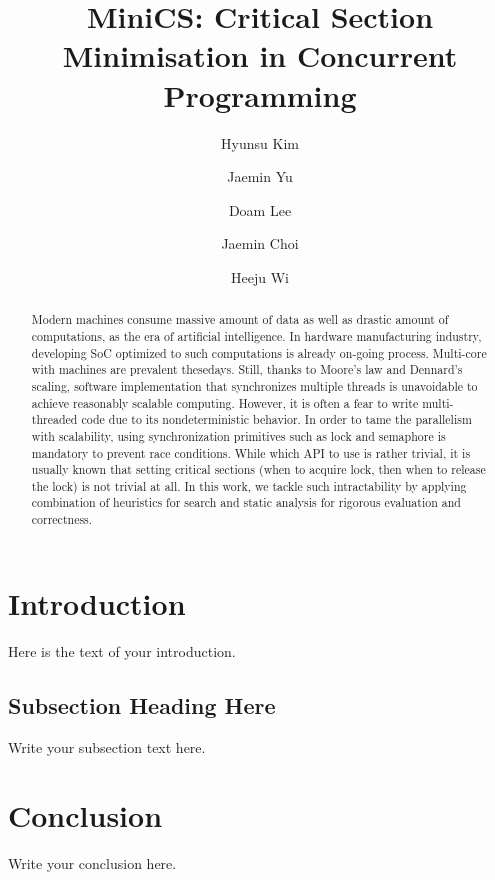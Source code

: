 \documentclass[sigchi]{acmart}
\begin{document}
\title{MiniCS: Critical Section Minimisation in Concurrent Programming}
\author{Hyunsu Kim}

\author{Jaemin Yu}

\author{Doam Lee}

\author{Jaemin Choi}

\author{Heeju Wi}

\begin{abstract}
Modern machines consume massive amount of data as well as drastic amount of computations, as the era of artificial intelligence. In hardware manufacturing industry, developing SoC optimized to such computations is already on-going process. Multi-core with machines are prevalent thesedays. Still, thanks to Moore's law and Dennard's scaling, software implementation that synchronizes multiple threads is unavoidable to achieve reasonably scalable computing. However, it is often a fear to write multi-threaded code due to its nondeterministic behavior. In order to tame the parallelism with scalability, using synchronization primitives such as lock and semaphore is mandatory to prevent race conditions. While which API to use is rather trivial, it is usually known that setting critical sections (when to acquire lock, then when to release the lock) is not trivial at all. In this work, we tackle such intractability by applying combination of heuristics for search and static analysis for rigorous evaluation and correctness.
\end{abstract}

\maketitle

\section{Introduction}
Here is the text of your introduction.

\subsection{Subsection Heading Here}
Write your subsection text here.

\section{Conclusion}
Write your conclusion here.
\end{document}
